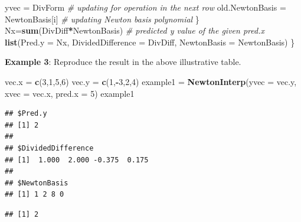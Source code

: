 \documentclass[
]{book}
\newenvironment{Shaded}{\begin{snugshade}}{\end{snugshade}}
\newcommand{\AttributeTok}[1]{\textcolor[rgb]{0.13,0.29,0.53}{#1}}
\newcommand{\CommentTok}[1]{\textcolor[rgb]{0.56,0.35,0.01}{\textit{#1}}}
\newcommand{\DecValTok}[1]{\textcolor[rgb]{0.00,0.00,0.81}{#1}}
\newcommand{\FunctionTok}[1]{\textcolor[rgb]{0.13,0.29,0.53}{\textbf{#1}}}
\newcommand{\NormalTok}[1]{#1}
\newcommand{\OtherTok}[1]{\textcolor[rgb]{0.56,0.35,0.01}{#1}}
\newcommand{\SpecialCharTok}[1]{\textcolor[rgb]{0.81,0.36,0.00}{\textbf{#1}}}
\begin{document}
\begin{Shaded}
\begin{Highlighting}[]
\NormalTok{    yvec }\OtherTok{=}\NormalTok{ DivForm                     }\CommentTok{\# updating for operation in the next row}
\NormalTok{    old.NewtonBasis }\OtherTok{=}\NormalTok{ NewtonBasis[i]   }\CommentTok{\# updating Newton basis polynomial}
\NormalTok{   \}}
\NormalTok{ Nx}\OtherTok{=}\FunctionTok{sum}\NormalTok{(DivDiff}\SpecialCharTok{*}\NormalTok{NewtonBasis)           }\CommentTok{\# predicted y value of the given pred.x}
 \FunctionTok{list}\NormalTok{(}\AttributeTok{Pred.y =}\NormalTok{ Nx, }\AttributeTok{DividedDifference =}\NormalTok{ DivDiff, }\AttributeTok{NewtonBasis =}\NormalTok{ NewtonBasis)}
\NormalTok{\}}
\end{Highlighting}
\end{Shaded}

\textbf{Example 3}: Reproduce the result in the above illustrative table.

\begin{Shaded}
\begin{Highlighting}[]
\NormalTok{vec.x }\OtherTok{=} \FunctionTok{c}\NormalTok{(}\DecValTok{3}\NormalTok{,}\DecValTok{1}\NormalTok{,}\DecValTok{5}\NormalTok{,}\DecValTok{6}\NormalTok{)          }
\NormalTok{vec.y }\OtherTok{=} \FunctionTok{c}\NormalTok{(}\DecValTok{1}\NormalTok{,}\SpecialCharTok{{-}}\DecValTok{3}\NormalTok{,}\DecValTok{2}\NormalTok{,}\DecValTok{4}\NormalTok{)}
\NormalTok{example1 }\OtherTok{=} \FunctionTok{NewtonInterp}\NormalTok{(}\AttributeTok{yvec =}\NormalTok{ vec.y, }\AttributeTok{xvec =}\NormalTok{ vec.x, }\AttributeTok{pred.x =} \DecValTok{5}\NormalTok{)}
\NormalTok{example1}
\end{Highlighting}
\end{Shaded}

\begin{verbatim}
## $Pred.y
## [1] 2
## 
## $DividedDifference
## [1]  1.000  2.000 -0.375  0.175
## 
## $NewtonBasis
## [1] 1 2 8 0
\end{verbatim}

\begin{Shaded}
\end{Shaded}

\begin{verbatim}
## [1] 2
\end{verbatim}
\end{document}
